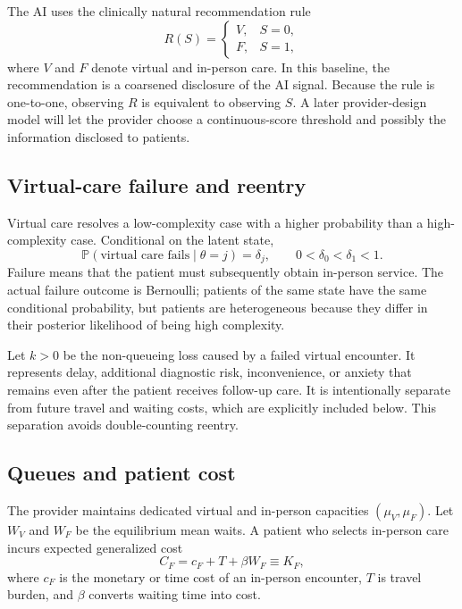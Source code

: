 \documentclass[11pt]{article}
\newcommand{\Prb}{\mathbb{P}}
\begin{document}
The AI uses the clinically natural recommendation rule
\begin{equation}
 R(S)=
 \begin{cases}
 V,&S=0,\\
 F,&S=1,
 \end{cases}
 \label{eq:recommendation}
\end{equation}
where $V$ and $F$ denote virtual and in-person care.  In this baseline, the recommendation is a coarsened disclosure of the AI signal.  Because the rule is one-to-one, observing $R$ is equivalent to observing $S$.  A later provider-design model will let the provider choose a continuous-score threshold and possibly the information disclosed to patients.

\subsection{Virtual-care failure and reentry}

Virtual care resolves a low-complexity case with a higher probability than a high-complexity case.  Conditional on the latent state,
\begin{equation}
 \Prb(\text{virtual care fails}\mid\theta=j)=\delta_j,
 \qquad 0<\delta_0<\delta_1<1.
 \label{eq:failure}
\end{equation}
Failure means that the patient must subsequently obtain in-person service.  The actual failure outcome is Bernoulli; patients of the same state have the same conditional probability, but patients are heterogeneous because they differ in their posterior likelihood of being high complexity.

Let $k>0$ be the non-queueing loss caused by a failed virtual encounter.  It represents delay, additional diagnostic risk, inconvenience, or anxiety that remains even after the patient receives follow-up care.  It is intentionally separate from future travel and waiting costs, which are explicitly included below.  This separation avoids double-counting reentry.

\subsection{Queues and patient cost}

The provider maintains dedicated virtual and in-person capacities $(\mu_V,\mu_F)$.  Let $W_V$ and $W_F$ be the equilibrium mean waits.  A patient who selects in-person care incurs expected generalized cost
\begin{equation}
 C_F=c_F+T+\beta W_F\equiv K_F,
 \label{eq:physicalcost}
\end{equation}
where $c_F$ is the monetary or time cost of an in-person encounter, $T$ is travel burden, and $\beta$ converts waiting time into cost.
\end{document}
